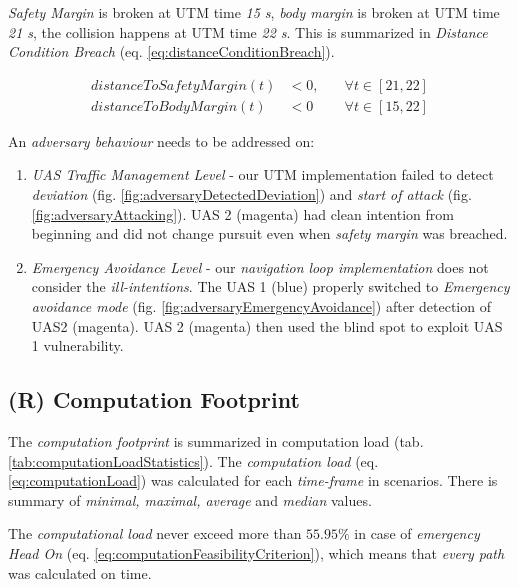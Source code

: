 \emph{Safety Margin} is broken at UTM time \emph{15 s}, \emph{body margin} is broken at UTM time \emph{21 s}, the collision happens at  UTM time \emph{22 s}. This is summarized in \emph{Distance Condition Breach} (eq. \ref{eq:distanceConditionBreach}).

\begin{equation}\label{eq:distanceConditionBreach}
    \begin{aligned}
    distanceToSafetyMargin(t) &< 0,\quad &\forall t \in [21,22]\\
    distanceToBodyMargin(t)  &< 0 \quad &\forall t \in [15,22]
    \end{aligned}
\end{equation}

\begin{note}
    An \emph{adversary behaviour} needs to be addressed on:
    \begin{enumerate}
        \item  \emph{UAS Traffic Management Level} -  our UTM implementation failed to detect \emph{deviation} (fig. \ref{fig:adversaryDetectedDeviation}) and \emph{start of attack} (fig. \ref{fig:adversaryAttacking}). UAS 2 (magenta) had clean intention from beginning and did not change pursuit even when \emph{safety margin} was breached. 
        
        \item  \emph{Emergency Avoidance Level} - our \emph{navigation loop implementation} does not consider the \emph{ill-intentions}. The UAS 1 (blue) properly switched to \emph{Emergency avoidance mode} (fig. \ref{fig:adversaryEmergencyAvoidance}) after detection of UAS2 (magenta). UAS 2 (magenta) then used the blind spot to exploit UAS 1 vulnerability.   
    \end{enumerate}
\end{note}

\newpage
\subsection{(R) Computation Footprint}\label{s:ComputaitonFootprint}

\noindent The \emph{computation footprint} is summarized in computation  load (tab. \ref{tab:computationLoadStatistics}). The \emph{computation load} (eq. \ref{eq:computationLoad}) was calculated for each \emph{time-frame} in scenarios. There is summary of \emph{minimal, maximal, average} and \emph{median} values.

The \emph{computational load} never exceed more than $55.95\%$ in case of  \emph{emergency Head On} (eq. \ref{eq:computationFeasibilityCriterion}), which means that \emph{every path} was calculated on time.

